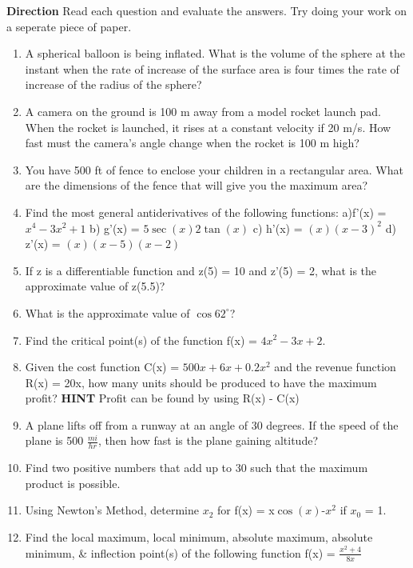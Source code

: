 \documentclass[12pt]{article}
\begin{document}
\textbf{Direction} Read each question and evaluate the answers. Try doing your work on a seperate piece of paper.
\begin{enumerate}
    \item A spherical balloon is being inflated. What is the volume of the sphere at the instant when the rate of increase of the surface area is four times the rate of increase of the radius of the sphere? 
    \item A camera on the ground is 100 m away from a model rocket launch pad. When the rocket is launched, it rises at a constant velocity if 20 m/s. How fast must the camera's angle change when the rocket is 100 m high?
    \item You have 500 ft of fence to enclose your children in a rectangular area. What are the dimensions of the fence that will give you the maximum area?
    \item Find the most general antiderivatives of the following functions: a)f'(x) = $x^{4}-3x^{2}+1$ b) g'(x) = $5\sec(x)2\tan(x)$ c) h'(x) =  $(x)(x-3)^{2}$ d) z'(x) = $(x)(x-5)(x-2)$
    \item If z is a differentiable function and z(5) = 10 and z'(5) = 2, what is the approximate value of z(5.5)? \newline 
    \item What is the approximate value of $\cos{62^{\circ}}$?
    \item Find the critical point(s) of the function f(x) = $4x^{2} - 3x + 2$.
    \item Given the cost function C(x) = $500x + 6x + 0.2x^{2}$ and the revenue function R(x) = 20x, how many units should be produced to have the maximum profit?
    \textbf{HINT} Profit can be found by using R(x) - C(x) \newline  
    \item A plane lifts off from a runway at an angle of 30 degrees. If the speed of the plane is 500 $\frac{mi}{hr}$, then how fast is the plane gaining altitude? 
    \item Find two positive numbers that add up to 30 such that the maximum product is possible. 
    \item Using Newton's Method, determine $x_{2}$ for f(x) = x$\cos(x)$-$x^{2}$ if $x_{0}$ = 1.
    \item Find the local maximum, local minimum, absolute maximum, absolute minimum, \& inflection point(s) of the following function f(x) = $\frac{x^{2}+4}{8x}$
\end{enumerate}
\end{document}
